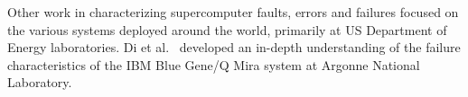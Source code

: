 Other work in characterizing supercomputer faults, errors and failures focused on the various systems deployed around the world, primarily at US Department of Energy laboratories.
%
Di et al.~\cite{8809553} developed an in-depth understanding of the failure characteristics of the IBM Blue Gene/Q Mira system at Argonne National Laboratory.